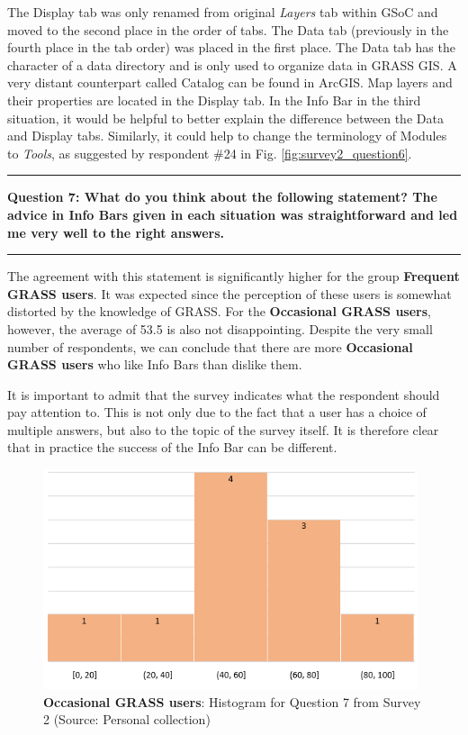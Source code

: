 \documentclass[a4paper,10pt,twoside]{article}
\begin{document}
\newpage
\noindent The Display tab was only renamed from original \textit{Layers} tab within GSoC and moved to the second place in the order of tabs. The Data tab (previously in the fourth place in the tab order) was placed in the first place. The Data tab has the character of a data directory and is only used to organize data in GRASS GIS. A very distant counterpart called Catalog can be found in ArcGIS. Map layers and their properties are located in the Display tab. In the Info Bar in the third situation, it would be helpful to better explain the difference between the Data and Display tabs. Similarly, it could help to change the terminology of Modules to \textit{Tools}, as suggested by respondent \#24 in Fig. \ref{fig:survey2_question6}.

\par\noindent\rule{\textwidth}{0.4pt}
\noindent \textbf{Question 7: What do you think about the following statement? The advice in Info Bars given in each situation was straightforward and led me very well to the right answers.}
\par\noindent\rule{\textwidth}{0.4pt}

\noindent The agreement with this statement is significantly higher for the group \textbf{Frequent GRASS users}. It was expected since the perception of these users is somewhat distorted by the knowledge of GRASS. For the \textbf{Occasional GRASS users}, however, the average of 53.5 is also not disappointing. Despite the very small number of respondents, we can conclude that there are more \textbf{Occasional GRASS users} who like Info Bars than dislike them. 

It is important to admit that the survey indicates what the respondent should pay attention to. This is not only due to the fact that a user has a choice of multiple answers, but also to the topic of the survey itself. It is therefore clear that in practice the success of the Info Bar can be different.

\vspace{0.3cm}
\begin{figure}[hbt!] 
\begin{center}
\includegraphics[width=11cm]{../surveys/analyzed_data/survey2_question7_histogram_group1.png} 
\caption[\textbf{Occasional GRASS users}: Histogram for Question 7 from Survey 2]{\textbf{Occasional GRASS users}: Histogram for Question 7 from Survey 2 (Source: Personal collection)}
\label{fig:survey2_question7_histogram_group1}
\end{center}
\end{figure}
\end{document}
